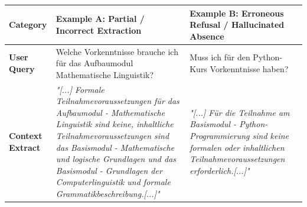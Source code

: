 \documentclass[12pt]{article} %
\begin{document}
\begin{table}[htbp]
    \centering
    \small
    \renewcommand{\arraystretch}{1.3}
    \begin{tabularx}{\textwidth}{l X X}
        \toprule
        \textbf{Category}                                                                                                                                                                                                                                                                                              & \textbf{Example A: Partial / Incorrect Extraction} & \textbf{Example B: Erroneous Refusal / Hallucinated Absence} \\
        \midrule
        \textbf{User Query}                                                                                                                                                                                                                                                                                            &
        Welche Vorkenntnisse brauche ich f\"ur das Aufbaumodul Mathematische Linguistik?                                                                                                                                                                                                                               &
        Muss ich f\"ur den Python-Kurs Vorkenntnisse haben?                                                                                                                                                                                                                                                                                                                                                                                \\
        \midrule
        \textbf{Context Extract}                                                                                                                                                                                                                                                                                       &
        \textit{"[...] Formale Teilnahmevoraussetzungen f\"ur das Aufbaumodul - Mathematische Linguistik sind keine, inhaltliche Teilnahmevoraussetzungen sind das Basismodul - Mathematische und logische Grundlagen und das Basismodul - Grundlagen der Computerlinguistik und formale Grammatikbeschreibung.[...]"} &
        \textit{"[...] F\"ur die Teilnahme am Basismodul - Python-Programmierung sind keine formalen oder inhaltlichen Teilnahmevoraussetzungen erforderlich.[...]"}                                                                                                                                                                                                                                                                       \\

\end{tabularx}
\end{table}
\end{document}
